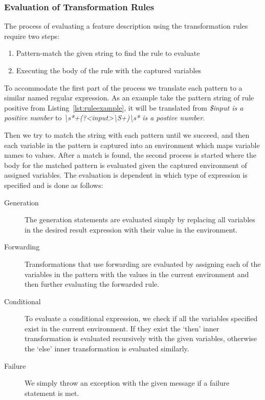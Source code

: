 \subsubsection{Evaluation of Transformation Rules}
\label{sub:Evaluation of Transformation Rules}

The process of evaluating a feature description using the transformation rules require two steps:
\begin{enumerate}
  \item Pattern-match the given string to find the rule to evaluate
  \item Executing the body of the rule with the captured variables
\end{enumerate}
To accommodate the first part of the process we translate each pattern to a
similar named regular expression. As an example take the pattern string of rule positive from Listing~\ref{lst:ruleexample}, it will be translated 
from \textit{\$input is a positive number} to \textit{\textbackslash s*+(?\textless input\textgreater\textbackslash S+)\textbackslash s* is a postive number}.

Then we try to match the string with each pattern until we succeed,
and then each variable in the pattern is captured into an environment
which maps variable names to values.
After a match is found, the second process is started where the body
for the matched pattern is evaluated given the captured environment of assigned variables.
The evaluation is dependent in which type of expression is specified
and is done as follows:

\begin{description}
  \item[Generation] The generation statements are evaluated simply
    by replacing all variables in the desired result expression with their 
    value in the environment. 
  \item[Forwarding] Transformations that use forwarding are evaluated by
    assigning each of the variables in the pattern with the values in the
    current environment and then further evaluating the forwarded rule.
  \item[Conditional] To evaluate a conditional expression, we check if all
    the variables specified exist in the current environment.
    If they exist the `then' inner transformation is evaluated recursively
    with the given variables, otherwise the `else' inner transformation
    is evaluated similarly.
  \item[Failure] We simply throw an exception with the given message
    if a failure statement is met.
\end{description}

